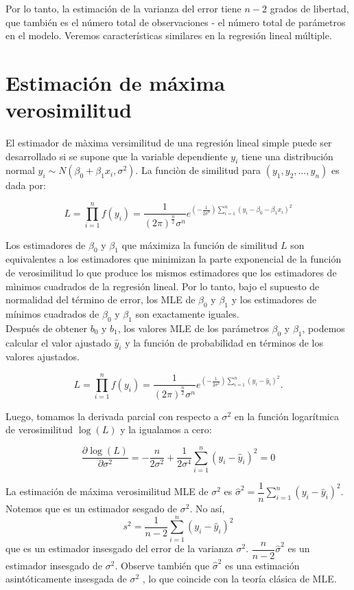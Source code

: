 Por lo tanto, la estimación de la varianza del error tiene $n - 2$ grados de libertad, que también es el número total de observaciones - el número total de parámetros en el modelo. Veremos características similares en la regresión lineal múltiple.


\section{Estimación de máxima verosimilitud}

El estimador de màxima versimilitud de una regresión lineal simple puede ser desarrollado si se supone que la variable dependiente $y_i$ tiene una distribución normal $y_i\sim N\left(\beta_0+\beta_1x_i,\sigma^2\right)$. La funciòn de similitud para $\left(y_1,y_2,\ldots,y_n\right)$ es dada por:

$$L=\prod_{i=1}^n f\left(y_i\right)=\dfrac{1}{(2\pi)^{\frac{n}{2}}\sigma^n}e^{\left(-\frac{1}{2\sigma^2}\right)\sum\limits_{i=1}^n \left(y_i-\beta_0-\beta_1x_i\right)^2}$$

Los estimadores de $\beta_0$ y $\beta_1$ que máximiza la función de similitud $L$ son equivalentes a los estimadores que minimizan la parte exponencial de la función de verosimilitud lo que produce los mismos estimadores que los estimadores de mìnimos cuadrados de la regresión lineal. Por lo tanto, bajo el supuesto de normalidad del término de error, los MLE de $\beta_0$ y $\beta_1$ y los estimadores de mínimos cuadrados de $\beta_0$ y $\beta_1$ son exactamente iguales.\\

Después de obtener $b_0$ y $b_1$, los valores MLE de los parámetros $\beta_0$ y $\beta_1$, podemos calcular el valor ajustado $\hat{y}_i$ y la función de probabilidad en términos de los valores ajustados.

$$L=\prod_{i=1}^n f\left(y_i\right)=\dfrac{1}{(2\pi)^{\frac{n}{2}}\sigma^n}e^{\left(-\frac{1}{2\sigma^2}\right)\sum\limits_{i=1}^n \left(y_i-\hat{y}_i\right)^2}.$$

Luego, tomamos la derivada parcial con respecto a $\sigma^2$ en la función logarítmica de verosimilitud $\log(L)$ y la igualamos a cero:

$$\dfrac{\partial \log(L)}{\partial \sigma^2}=-\dfrac{n}{2\sigma^2}+\dfrac{1}{2\sigma^4}\sum_{i=1}^n \left(y_i-\hat{y}_i\right)^2=0$$

La estimación de máxima verosimilitud MLE de $\sigma^2$ es $\hat{\sigma}^2=\dfrac{1}{n}\displaystyle\sum_{i=1}^n\left(y_i-\hat{y}_i\right)^2$. Notemos que es un estimador sesgado de $\sigma^2$. No así, 
$$s^2=\dfrac{1}{n-2}\displaystyle\sum_{i=1}^n\left(y_i-\hat{y}_i\right)^2$$ 
que es un estimador insesgado del error de la varianza $\sigma^2$. $\dfrac{n}{n-2}\hat{\sigma}^2$ es un estimador insesgado de $\sigma^2$. Observe también  que $\hat{\sigma}^2$ es una estimación asintóticamente insesgada de $\sigma^2$ , lo que coincide con la teoría clásica de MLE.


